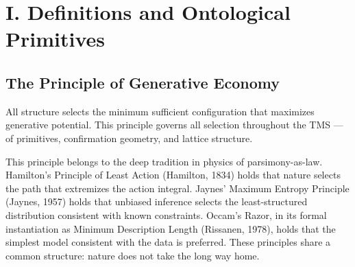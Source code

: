 \documentclass[11pt,oneside]{report}
\theoremstyle{definition}
\theoremstyle{remark}
\begin{document}
\section*{I. Definitions and Ontological Primitives}

\subsection*{The Principle of Generative Economy}

All structure selects the minimum sufficient configuration that
maximizes generative potential. This principle governs all selection
throughout the TMS --- of primitives, confirmation geometry, and lattice
structure.

This principle belongs to the deep tradition in physics of
parsimony-as-law. Hamilton's Principle of Least Action (Hamilton, 1834)
holds that nature selects the path that extremizes the action integral.
Jaynes' Maximum Entropy Principle (Jaynes, 1957) holds that unbiased
inference selects the least-structured distribution consistent with
known constraints. Occam's Razor, in its formal instantiation as Minimum
Description Length (Rissanen, 1978), holds that the simplest model
consistent with the data is preferred. These principles share a common
structure: nature does not take the long way home.
\end{document}
